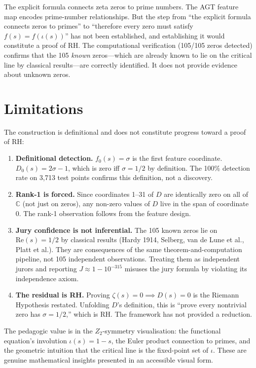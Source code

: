 \documentclass[11pt,a4paper]{article}
\begin{document}
The explicit formula connects zeta zeros to prime numbers. The AGT feature map encodes prime-number relationships. But the step from ``the explicit formula connects zeros to primes'' to ``therefore every zero must satisfy $f(s)=f(\iota(s))$'' has not been established, and establishing it would constitute a proof of RH. The computational verification (105/105 zeros detected) confirms that the 105 \textit{known} zeros---which are already known to lie on the critical line by classical results---are correctly identified. It does not provide evidence about unknown zeros.

\section{Limitations}

The construction is definitional and does not constitute progress toward a proof of RH:

\begin{enumerate}[nosep]
\item \textbf{Definitional detection.} $f_0(s) = \sigma$ is the first feature coordinate. $D_0(s) = 2\sigma-1$, which is zero iff $\sigma=1/2$ by definition. The 100\% detection rate on 3,713 test points confirms this definition, not a discovery.
\item \textbf{Rank-1 is forced.} Since coordinates 1--31 of $D$ are identically zero on all of $\mathbb{C}$ (not just on zeros), any non-zero values of $D$ live in the span of coordinate 0. The rank-1 observation follows from the feature design.
\item \textbf{Jury confidence is not inferential.} The 105 known zeros lie on $\mathrm{Re}(s)=1/2$ by classical results (Hardy 1914, Selberg, van de Lune et al., Platt et al.). They are consequences of the same theorem-and-computation pipeline, not 105 independent observations. Treating them as independent jurors and reporting $J\approx 1-10^{-315}$ misuses the jury formula by violating its independence axiom.
\item \textbf{The residual is RH.} Proving $\zeta(s)=0 \implies D(s)=0$ is the Riemann Hypothesis restated. Unfolding $D$'s definition, this is ``prove every nontrivial zero has $\sigma=1/2$,'' which is RH. The framework has not provided a reduction.
\end{enumerate}

The pedagogic value is in the $Z_2$-symmetry visualisation: the functional equation's involution $\iota(s)=1-s$, the Euler product connection to primes, and the geometric intuition that the critical line is the fixed-point set of $\iota$. These are genuine mathematical insights presented in an accessible visual form.
\end{document}
